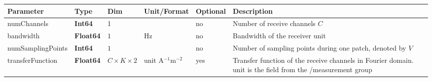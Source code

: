 \documentclass[landscape,a4paper]{article} %
\newcommand{\inltab}[1]{{\ttfamily\bfseries\color{blue}#1}}
\newcommand{\inlvar}[1]{{\ttfamily#1}}
\begin{document}
\noindent \begin{tabularx}{\columnwidth}{lllllX} 
\textbf{Parameter} & \textbf{Type} & \textbf{Dim} & \textbf{Unit/Format} & \textbf{Optional} & \textbf{Description} \\ \hline 
\inlvar{numChannels} & \inltab{Int64} & 1 & & no & Number of receive channels $C$ \\ \hline 
\inlvar{bandwidth} & \inltab{Float64} & $1$ & Hz & no & Bandwidth of the receiver unit \\ \hline
\inlvar{numSamplingPoints} & \inltab{Int64} & $1$ &  & no & Number of sampling points during one patch, denoted by $V$ \\ \hline
\inlvar{transferFunction} & \inltab{Float64} & $C \times K \times 2$ & \inlvar{unit} A$^{-1}$m$^{-2}$ 
& yes & Transfer function of the receive channels in Fourier domain. \inlvar{unit} is the field from the \inlvar{/measurement} group \\ \hline
\end{tabularx}
\end{document}
